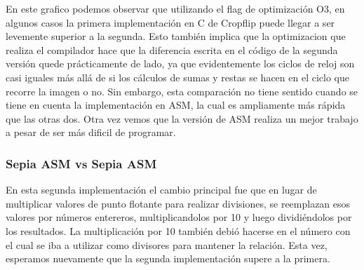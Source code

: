 \documentclass[a4paper]{article}
\begin{document}
\begin{centering}
\end{centering}

En este grafico podemos observar que utilizando el flag de optimización O3, en algunos casos la primera implementación en C de Cropflip puede llegar
a ser levemente superior a la segunda. Esto también implica que la optimizacion que realiza el compilador hace que la diferencia escrita en el código de la segunda versión
 quede prácticamente de lado, ya que evidentemente los ciclos de reloj son casi iguales más allá de si los cálculos de sumas y restas se hacen en el ciclo que recorre la imagen o no.
 Sin embargo, esta comparación no tiene sentido cuando se tiene en cuenta la implementación en ASM, la cual es
ampliamente más rápida que las otras dos. Otra vez vemos que la versión de ASM realiza un mejor trabajo a pesar de ser más dificil de programar.

\subsubsection{Sepia ASM vs Sepia ASM}
En esta segunda implementación el cambio principal fue que en lugar de multiplicar valores de punto flotante para realizar divisiones, se reemplazan
 esos valores por números entereros, multiplicandolos por 10 y luego dividiéndolos por los resultados. La multiplicación por 10 también debió hacerse
en el número con el cual se iba a utilizar como divisores para mantener la relación. Esta vez, esperamos nuevamente que la segunda implementación supere a la primera.
\end{document}
